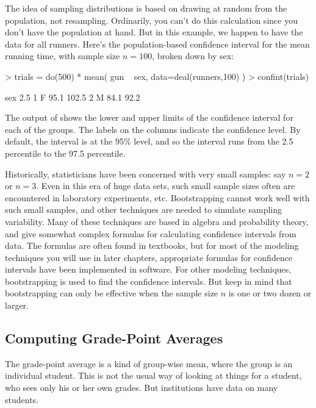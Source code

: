 The idea of sampling distributions is based on
drawing at random from the population, not resampling.  Ordinarily,
you can't do this calculation since you don't have the population at
hand.  But in this example, we happen to have the data for all
runners.  Here's the population-based confidence interval for the mean
running time, with sample size $n=100$, broken down by sex:


\begin{Schunk}
\begin{Sinput}
> trials = do(500) * mean( gun ~ sex, data=deal(runners,100) )
> confint(trials)
\end{Sinput}
\begin{Soutput}
  sex 2.5% 97.5%
1   F 95.1 102.5
2   M 84.1  92.2
\end{Soutput}
\end{Schunk}


The output of  shows the lower and upper limits of
the confidence interval for each of the groups.  The labels on the
columns indicate the confidence level.  By default, the interval is at
the 95\% level, and so the interval runs from the 2.5 percentile to
the 97.5 percentile. 

Historically, statisticians have been concerned with very small
samples: say $n=2$ or $n=3$.  Even in this era of huge data sets, such
small sample sizes often are encountered in laboratory experiments,
etc. Bootstrapping cannot work well with such
small samples, and other techniques are needed to simulate sampling
variability.  Many of these techniques are based in algebra and
probability theory, and give somewhat complex formulas for calculating confidence
intervals from data. The formulas are often found in textbooks, but for most of the modeling techniques you will use
in later chapters, appropriate formulas for confidence intervals have been implemented in
software.  For other modeling techniques, bootstrapping is used to 
find the confidence intervals.  But keep in mind that bootstrapping
can only be effective when the sample size $n$ is one or two dozen or
larger.  


\subsection{Computing Grade-Point Averages}

The grade-point average is a kind of group-wise mean, where the group
is an individual student.  This is not the usual way of looking at
things for a student, who sees only his or her own grades.  But
institutions have data on many students.

